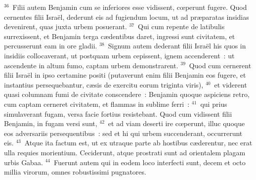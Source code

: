${}^{36}$~Filii autem Benjamin cum se inferiores esse vidissent, cœperunt fugere. Quod cernentes filii Isra\"el, dederunt eis ad fugiendum locum, ut ad pr\ae paratas insidias devenirent, quas juxta urbem posuerant.
${}^{37}$~Qui cum repente de latibulis surrexissent, et Benjamin terga c\ae dentibus daret, ingressi sunt civitatem, et percusserunt eam in ore gladii.
${}^{38}$~Signum autem dederant filii Isra\"el his quos in insidiis collocaverant, ut postquam urbem cepissent, ignem accenderent~: ut ascendente in altum fumo, captam urbem demonstrarent.
${}^{39}$~Quod cum cernerent filii Isra\"el in ipso certamine positi (putaverunt enim filii Benjamin eos fugere, et instantius persequebantur, c\ae sis de exercitu eorum triginta viris),
${}^{40}$~et viderent quasi columnam fumi de civitate conscendere~: Benjamin quoque aspiciens retro, cum captam cerneret civitatem, et flammas in sublime ferri~:
${}^{41}$~qui prius simulaverant fugam, versa facie fortius resistebant. Quod cum vidissent filii Benjamin, in fugam versi sunt,
${}^{42}$~et ad viam deserti ire cœperunt, illuc quoque eos adversariis persequentibus~: sed et hi qui urbem succenderant, occurrerunt eis.
${}^{43}$~Atque ita factum est, ut ex utraque parte ab hostibus c\ae derentur, nec erat ulla requies morientium. Ceciderunt, atque prostrati sunt ad orientalem plagam urbis Gabaa.
${}^{44}$~Fuerunt autem qui in eodem loco interfecti sunt, decem et octo millia virorum, omnes robustissimi pugnatores.


